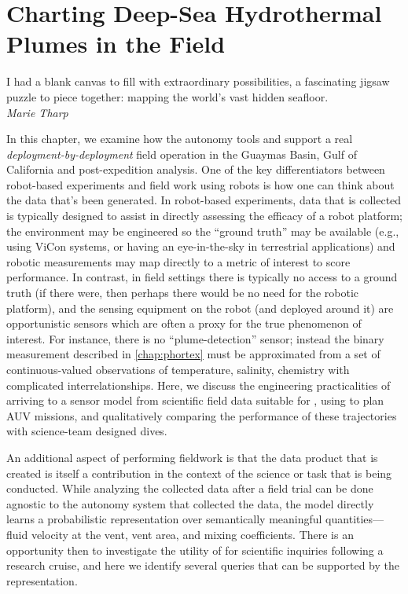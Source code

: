 \chapter{Charting Deep-Sea Hydrothermal Plumes in the Field}
\label{chap:field_results}

\begin{center}
    \begin{minipage}{0.7\textwidth}
      \begin{small}
      I had a blank canvas to fill with extraordinary possibilities, a fascinating jigsaw puzzle to piece together: mapping the world's vast hidden seafloor.\\ \emph{Marie Tharp}
      \end{small}
    \end{minipage}
    \vspace{0.5cm}
\end{center}

In this chapter, we examine how the autonomy tools \PHORTEX and \PHUMES support a real \emph{deployment-by-deployment} field operation in the Guaymas Basin, Gulf of California and post-expedition analysis. One of the key differentiators between robot-based experiments and field work using robots is how one can think about the data that's been generated. In robot-based experiments, data that is collected is typically designed to assist in directly assessing the efficacy of a robot platform; the environment may be engineered so the ``ground truth'' may be available (e.g., using ViCon systems, or having an eye-in-the-sky in terrestrial applications) and robotic measurements may map directly to a metric of interest to score performance. In contrast, in field settings there is typically no access to a ground truth (if there were, then perhaps there would be no need for the robotic platform), and the sensing equipment on the robot (and deployed around it) are opportunistic sensors which are often a proxy for the true phenomenon of interest. For instance, there is no ``plume-detection'' sensor; instead the binary measurement described in \cref{chap:phortex} must be approximated from a set of continuous-valued observations of temperature, salinity, chemistry with complicated interrelationships. Here, we discuss the engineering practicalities of arriving to a sensor model from scientific field data suitable for \PHUMES, using \PHORTEX to plan AUV \Sentry missions, and qualitatively comparing the performance of these trajectories with science-team designed dives. 

An additional aspect of performing fieldwork is that the data product that is created is itself a contribution in the context of the science or task that is being conducted. While analyzing the collected data after a field trial can be done agnostic to the autonomy system that collected the data, the \PHUMES model directly learns a probabilistic representation over semantically meaningful quantities---fluid velocity at the vent, vent area, and mixing coefficients. There is an opportunity then to investigate the utility of \PHUMES for scientific inquiries following a research cruise, and here we identify several queries that can be supported by the \PHUMES representation. 

